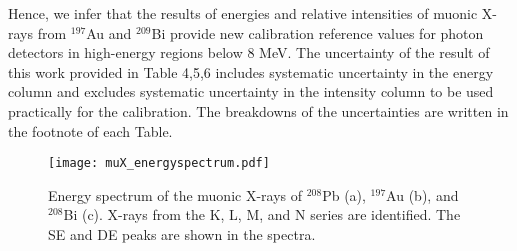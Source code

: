 Hence, we infer that the results of energies and relative intensities of muonic X-rays from $^{197}$Au and $^{209}$Bi provide new calibration reference values for photon detectors in high-energy regions below 8 MeV. 
The uncertainty of the result of this work provided in Table 4,5,6 includes systematic uncertainty in the energy column and excludes systematic uncertainty in the intensity column to be used practically for the calibration. The breakdowns of the uncertainties are written in the footnote of each Table.

\begin{figure*}[width=0.85\textwidth, cols=4,pos=h]
    \centering
    \texttt{[image: muX\_energyspectrum.pdf]}
    \caption{Energy spectrum of the muonic X-rays of $^{208}$Pb (a), $^{197}$Au (b), and $^{208}$Bi (c). X-rays from the K, L, M, and N series are identified. The SE and DE peaks are shown in the spectra.}
    \label{fig:muX_energyspectrum}
\end{figure*}

